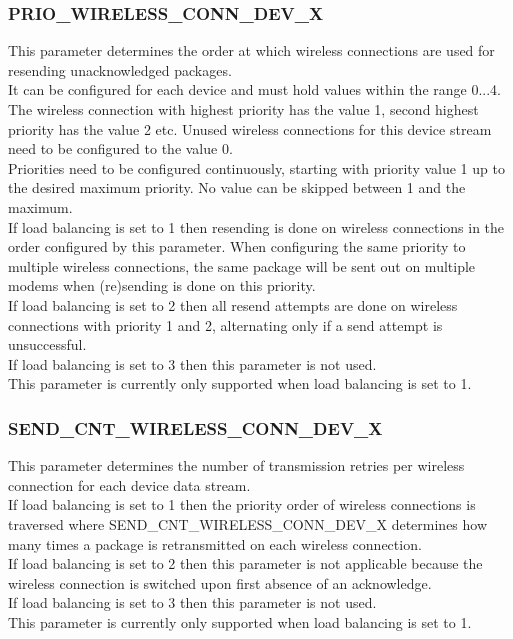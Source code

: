 \subsubsection{PRIO\_WIRELESS\_CONN\_DEV\_X}
This parameter determines the order at which wireless connections are used for resending unacknowledged packages.\\
It can be configured for each device and must hold values within the range 0...4. The wireless connection with highest priority has the value 1, second highest priority has the value 2 etc. Unused wireless connections for this device stream need to be configured to the value 0.\\
Priorities need to be configured continuously, starting with priority value 1 up to the desired maximum priority. No value can be skipped between 1 and the maximum.\\
If load balancing is set to 1 then resending is done on wireless connections in the order configured by this parameter. When configuring the same priority to multiple wireless connections, the same package will be sent out on multiple modems when (re)sending is done on this priority.\\
If load balancing is set to 2 then all resend attempts are done on wireless connections with priority 1 and 2, alternating only if a send attempt is unsuccessful.\\
If load balancing is set to 3 then this parameter is not used.\\
This parameter is currently only supported when load balancing is set to 1.
%
\subsubsection{SEND\_CNT\_WIRELESS\_CONN\_DEV\_X}
This parameter determines the number of transmission retries per wireless connection for each device data stream.\\
If load balancing is set to 1 then the priority order of wireless connections is traversed where SEND\_CNT\_WIRELESS\_CONN\_DEV\_X determines how many times a package is retransmitted on each wireless connection.\\
If load balancing is set to 2 then this parameter is not applicable because the wireless connection is switched upon first absence of an acknowledge.\\
If load balancing is set to 3 then this parameter is not used.\\
This parameter is currently only supported when load balancing is set to 1.
%
